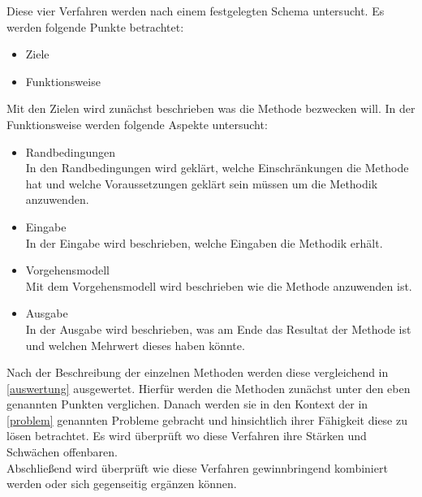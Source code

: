 Diese vier Verfahren werden nach einem festgelegten Schema untersucht. Es werden folgende Punkte betrachtet:\\

\begin{itemize}
\item Ziele
\item Funktionsweise\\
\end{itemize}

Mit den Zielen wird zun\"achst beschrieben was die Methode bezwecken will. In der Funktionsweise werden folgende Aspekte untersucht:\\

\begin{itemize}
\item Randbedingungen \\
In den Randbedingungen wird gekl\"art, welche Einschr\"ankungen die Methode hat und welche Voraussetzungen gekl\"art sein m\"ussen um die Methodik anzuwenden.
\item Eingabe \\
In der Eingabe wird beschrieben, welche Eingaben die Methodik erh\"alt.
\item Vorgehensmodell \\
Mit dem Vorgehensmodell wird beschrieben wie die Methode anzuwenden ist.
\item Ausgabe \\
In der Ausgabe wird beschrieben, was am Ende das Resultat der Methode ist und welchen Mehrwert dieses haben k\"onnte.\\
\end{itemize}

Nach der Beschreibung der einzelnen Methoden werden diese vergleichend in \ref{auswertung} ausgewertet. Hierf\"ur werden die Methoden zun\"achst unter den eben genannten Punkten verglichen. Danach werden sie in den Kontext der in \ref{problem} genannten Probleme gebracht und hinsichtlich ihrer F\"ahigkeit diese zu l\"osen betrachtet. Es wird \"uberpr\"uft wo diese Verfahren ihre St\"arken und Schw\"achen offenbaren. \\

Abschlie\ss{}end wird \"uberpr\"uft wie diese Verfahren gewinnbringend kombiniert werden oder sich gegenseitig erg\"anzen k\"onnen. 
